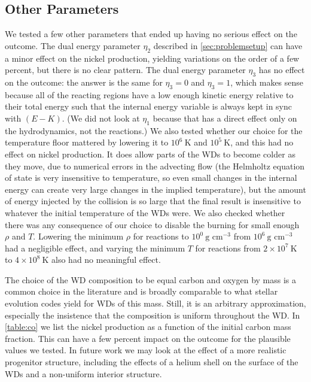 \documentclass[twocolumn,numberedappendix]{../aastex6}
\begin{document}
\subsection{Other Parameters}

We tested a few other parameters that ended up having no serious effect on the outcome.
The dual energy parameter $\eta_2$ described in \autoref{sec:problemsetup} can have a
minor effect on the nickel production, yielding variations on the order of a few percent,
but there is no clear pattern. The dual energy parameter $\eta_3$ has no effect on the
outcome: the answer is the same for $\eta_3 = 0$ and $\eta_3 = 1$, which makes sense
because all of the reacting regions have a low enough kinetic energy relative to their
total energy such that the internal energy variable is always kept in sync with $(E - K)$.
(We did not look at $\eta_1$ because that has a direct effect only on the hydrodynamics,
not the reactions.) We also tested whether our choice for the temperature floor mattered
by lowering it to $10^6\ \text{K}$ and $10^5\ \text{K}$, and this had no effect on nickel
production. It does allow parts of the WDs to become colder as they move, due to numerical
errors in the advecting flow (the Helmholtz equation of state is very insensitive to
temperature, so even small changes in the internal energy can create very large changes
in the implied temperature), but the amount of energy injected by the collision is so
large that the final result is insensitive to whatever the initial temperature of the
WDs were. We also checked whether there was any consequence of our choice to disable the
burning for small enough $\rho$ and $T$. Lowering the minimum $\rho$ for reactions to
$10^0\ \text{g cm}^{-3}$ from $10^6\ \text{g cm}^{-3}$ had a negligible effect,
and varying the minimum $T$ for reactions from $2 \times 10^{7}\ \text{K}$ to
$4 \times 10^{8}\ \text{K}$ also had no meaningful effect.


The choice of the WD composition to be equal carbon and oxygen by mass is a common
choice in the literature and is broadly comparable to what stellar evolution codes
yield for WDs of this mass. Still, it is an arbitrary approximation, especially the
insistence that the composition is uniform throughout the WD. In \autoref{table:co}
we list the nickel production as a function of the initial carbon mass fraction.
This can have a few percent impact on the outcome for the plausible values we tested.
In future work we may look at the effect of a more realistic progenitor structure,
including the effects of a helium shell on the surface of the WDs \citep{holcomb:2015}
and a non-uniform interior structure.
\end{document}

